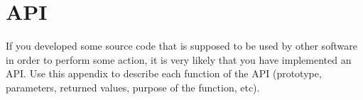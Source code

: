\chapter{API}
\label{api}
If you developed some source code that is supposed to be used by other software in order to perform some action, it is very likely that you have implemented an API. Use this appendix to describe each function of the API (prototype, parameters, returned values, purpose of the function, etc).
